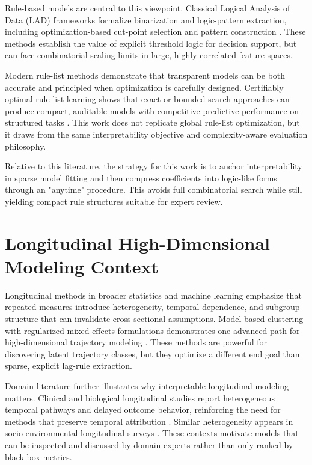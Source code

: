 Rule-based models are central to this viewpoint. Classical Logical Analysis of Data (LAD) frameworks formalize binarization and logic-pattern extraction, including optimization-based cut-point selection and pattern construction \autocites{EBoros1997Logical,EBoros2000implementation}. These methods establish the value of explicit threshold logic for decision support, but can face combinatorial scaling limits in large, highly correlated feature spaces.

Modern rule-list methods demonstrate that transparent models can be both accurate and principled when optimization is carefully designed. Certifiably optimal rule-list learning shows that exact or bounded-search approaches can produce compact, auditable models with competitive predictive performance on structured tasks \autocite{EAngelino2018Learning}. This work does not replicate global rule-list optimization, but it draws from the same interpretability objective and complexity-aware evaluation philosophy.

Relative to this literature, the strategy for this work is to anchor interpretability in sparse model fitting and then compress coefficients into logic-like forms through an "anytime" procedure. This avoids full combinatorial search while still yielding compact rule structures suitable for expert review.

\section{Longitudinal High-Dimensional Modeling Context}

Longitudinal methods in broader statistics and machine learning emphasize that repeated measures introduce heterogeneity, temporal dependence, and subgroup structure that can invalidate cross-sectional assumptions. Model-based clustering with regularized mixed-effects formulations demonstrates one advanced path for high-dimensional trajectory modeling \autocite{yang2023model}. These methods are powerful for discovering latent trajectory classes, but they optimize a different end goal than sparse, explicit lag-rule extraction.

Domain literature further illustrates why interpretable longitudinal modeling matters. Clinical and biological longitudinal studies report heterogeneous temporal pathways and delayed outcome behavior, reinforcing the need for methods that preserve temporal attribution \autocites{hiploylee2017,wong2010longitudinal}. Similar heterogeneity appears in socio-environmental longitudinal surveys \autocite{sorvali2021farmer}. These contexts motivate models that can be inspected and discussed by domain experts rather than only ranked by black-box metrics.

